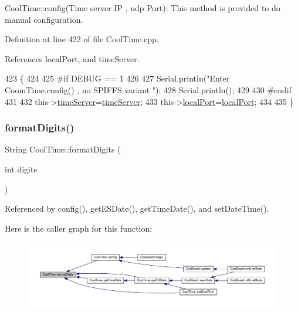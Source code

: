 Cool\+Time\+::config(\+Time server I\+P , udp Port)\+: This method is provided to do manual configuration. 

Definition at line 422 of file Cool\+Time.\+cpp.



References local\+Port, and time\+Server.


\begin{DoxyCode}
423 \{
424 
425 \textcolor{preprocessor}{#if DEBUG == 1 }
426 
427     Serial.println(\textcolor{stringliteral}{"Enter CoomTime.config() , no SPIFFS variant "});
428     Serial.println();
429 
430 \textcolor{preprocessor}{#endif }
431 
432     this->\hyperlink{classCoolTime_ad2b9858f399108cb440dd1e908916f04}{timeServer}=\hyperlink{classCoolTime_ad2b9858f399108cb440dd1e908916f04}{timeServer};
433     this->\hyperlink{classCoolTime_a2f777da44d7ba678be8185299e9b49d1}{localPort}=\hyperlink{classCoolTime_a2f777da44d7ba678be8185299e9b49d1}{localPort};
434     
435 \} 
\end{DoxyCode}
\mbox{\label{classCoolTime_acd537cd4210d7bde4e1f5c47d2ac0456}} 
\subsubsection{\texorpdfstring{format\+Digits()}{formatDigits()}}
{\footnotesize\ttfamily String Cool\+Time\+::format\+Digits (\begin{DoxyParamCaption}\item[{int}]{digits }\end{DoxyParamCaption})}



Referenced by config(), get\+E\+S\+Date(), get\+Time\+Date(), and set\+Date\+Time().

Here is the caller graph for this function\+:
\nopagebreak
\begin{figure}[H]
\begin{center}
\leavevmode
\includegraphics[width=350pt]{classCoolTime_acd537cd4210d7bde4e1f5c47d2ac0456_icgraph}
\end{center}
\end{figure}
\mbox{\label{classCoolTime_ac4f32ee513c1328d984306645e8785a4}} 
